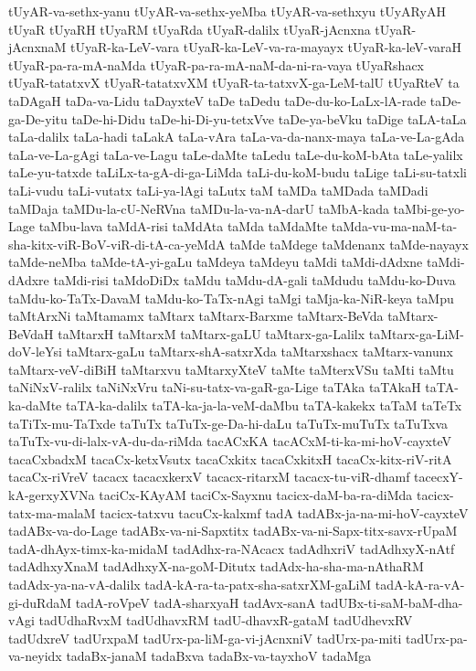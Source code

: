 {tUyAR-va-sethx-yanu
tUyAR-va-sethx-yeMba
tUyAR-va-sethxyu
tUyARyAH
tUyaR
tUyaRH
tUyaRM
tUyaRda
tUyaR-dalilx
tUyaR-jAcnxna
tUyaR-jAcnxnaM
tUyaR-ka-LeV-vara
tUyaR-ka-LeV-va-ra-mayayx
tUyaR-ka-leV-varaH
tUyaR-pa-ra-mA-naMda
tUyaR-pa-ra-mA-naM-da-ni-ra-vaya
tUyaRshacx
tUyaR-tatatxvX
tUyaR-tatatxvXM
tUyaR-ta-tatxvX-ga-LeM-talU
tUyaRteV
ta
taDAgaH
taDa-va-Lidu
taDayxteV
taDe
taDedu
taDe-du-ko-LaLx-lA-rade
taDe-ga-De-yitu
taDe-hi-Didu
taDe-hi-Di-yu-tetxVve
taDe-ya-beVku
taDige
taLA-taLa
taLa-dalilx
taLa-hadi
taLakA
taLa-vAra
taLa-va-da-nanx-maya
taLa-ve-La-gAda
taLa-ve-La-gAgi
taLa-ve-Lagu
taLe-daMte
taLedu
taLe-du-koM-bAta
taLe-yalilx
taLe-yu-tatxde
taLiLx-ta-gA-di-ga-LiMda
taLi-du-koM-budu
taLige
taLi-su-tatxli
taLi-vudu
taLi-vutatx
taLi-ya-lAgi
taLutx
taM
taMDa
taMDada
taMDadi
taMDaja
taMDu-la-cU-NeRVna
taMDu-la-va-nA-darU
taMbA-kada
taMbi-ge-yo-Lage
taMbu-lava
taMdA-risi
taMdAta
taMda
taMdaMte
taMda-vu-ma-naM-ta-sha-kitx-viR-BoV-viR-di-tA-ca-yeMdA
taMde
taMdege
taMdenanx
taMde-nayayx
taMde-neMba
taMde-tA-yi-gaLu
taMdeya
taMdeyu
taMdi
taMdi-dAdxne
taMdi-dAdxre
taMdi-risi
taMdoDiDx
taMdu
taMdu-dA-gali
taMdudu
taMdu-ko-Duva
taMdu-ko-TaTx-DavaM
taMdu-ko-TaTx-nAgi
taMgi
taMja-ka-NiR-keya
taMpu
taMtArxNi
taMtamamx
taMtarx
taMtarx-Barxme
taMtarx-BeVda
taMtarx-BeVdaH
taMtarxH
taMtarxM
taMtarx-gaLU
taMtarx-ga-Lalilx
taMtarx-ga-LiM-doV-leYsi
taMtarx-gaLu
taMtarx-shA-satxrXda
taMtarxshacx
taMtarx-vanunx
taMtarx-veV-diBiH
taMtarxvu
taMtarxyXteV
taMte
taMterxVSu
taMti
taMtu
taNiNxV-ralilx
taNiNxVru
taNi-su-tatx-va-gaR-ga-Lige
taTAka
taTAkaH
taTA-ka-daMte
taTA-ka-dalilx
taTA-ka-ja-la-veM-daMbu
taTA-kakekx
taTaM
taTeTx
taTiTx-mu-TaTxde
taTuTx
taTuTx-ge-Da-hi-daLu
taTuTx-muTuTx
taTuTxva
taTuTx-vu-di-lalx-vA-du-da-riMda
tacACxKA
tacACxM-ti-ka-mi-hoV-cayxteV
tacaCxbadxM
tacaCx-ketxVsutx
tacaCxkitx
tacaCxkitxH
tacaCx-kitx-riV-ritA
tacaCx-riVreV
tacacx
tacacxkerxV
tacacx-ritarxM
tacacx-tu-viR-dhamf
tacecxY-kA-gerxyXVNa
taciCx-KAyAM
taciCx-Sayxnu
tacicx-daM-ba-ra-diMda
tacicx-tatx-ma-malaM
tacicx-tatxvu
tacuCx-kalxmf
tadA
tadABx-ja-na-mi-hoV-cayxteV
tadABx-va-do-Lage
tadABx-va-ni-Sapxtitx
tadABx-va-ni-Sapx-titx-savx-rUpaM
tadA-dhAyx-timx-ka-midaM
tadAdhx-ra-NAcacx
tadAdhxriV
tadAdhxyX-nAtf
tadAdhxyXnaM
tadAdhxyX-na-goM-Ditutx
tadAdx-ha-sha-ma-nAthaRM
tadAdx-ya-na-vA-dalilx
tadA-kA-ra-ta-patx-sha-satxrXM-gaLiM
tadA-kA-ra-vA-gi-duRdaM
tadA-roVpeV
tadA-sharxyaH
tadAvx-sanA
tadUBx-ti-saM-baM-dha-vAgi
tadUdhaRvxM
tadUdhavxRM
tadU-dhavxR-gataM
tadUdhevxRV
tadUdxreV
tadUrxpaM
tadUrx-pa-liM-ga-vi-jAcnxniV
tadUrx-pa-miti
tadUrx-pa-va-neyidx
tadaBx-janaM
tadaBxva
tadaBx-va-tayxhoV
tadaMga
}
